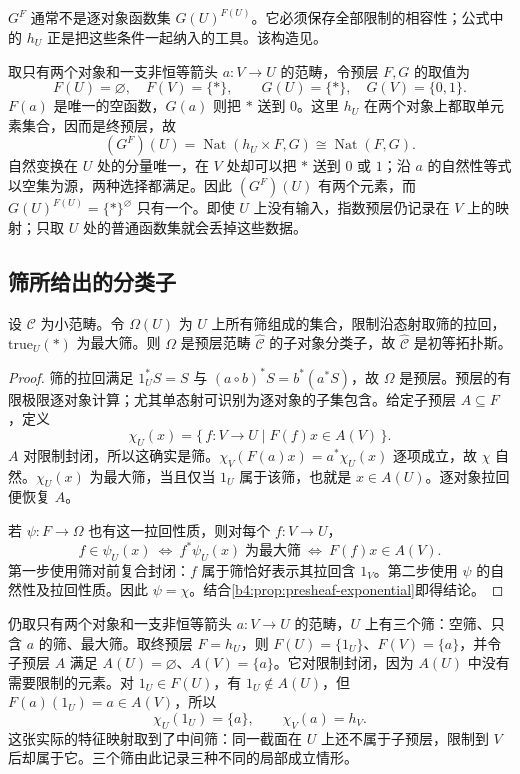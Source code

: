 \(G^F\) 通常不是逐对象函数集 \(G(U)^{F(U)}\)。它必须保存全部限制的相容性；公式中的 \(h_U\) 正是把这些条件一起纳入的工具。该构造见\cite[Chapter I, Section 6]{MacLaneMoerdijk1992Sheaves}。

\ProseParagraphBreak
取只有两个对象和一支非恒等箭头 \(a:V\to U\) 的范畴，令预层 \(F,G\) 的取值为
\[
	F(U)=\varnothing,\quad F(V)=\{*\},\qquad G(U)=\{*\},\quad G(V)=\{0,1\}.
\]
\(F(a)\) 是唯一的空函数，\(G(a)\) 则把 \(*\) 送到 \(0\)。这里 \(h_U\) 在两个对象上都取单元素集合，因而是终预层，故
\[
	(G^F)(U)=\operatorname{Nat}(h_U\times F,G) \cong\operatorname{Nat}(F,G).
\]
自然变换在 \(U\) 处的分量唯一，在 \(V\) 处却可以把 \(*\) 送到 \(0\) 或 \(1\)；沿 \(a\) 的自然性等式以空集为源，两种选择都满足。因此 \((G^F)(U)\) 有两个元素，而 \(G(U)^{F(U)}=\{*\}^{\varnothing}\) 只有一个。即使 \(U\) 上没有输入，指数预层仍记录在 \(V\) 上的映射；只取 \(U\) 处的普通函数集就会丢掉这些数据。

\subsection{筛所给出的分类子}
\label{b4:subsec:E02:03}

\begin{theorem}\label{b4:thm:presheaf-topos}
	设 \(\mathcal C\) 为小范畴。令 \(\Omega(U)\) 为 \(U\) 上所有筛组成的集合，限制沿态射取筛的拉回，\(\mathrm{true}_U(*)\) 为最大筛。则 \(\Omega\) 是预层范畴 \(\widehat{\mathcal C}\) 的子对象分类子，故 \(\widehat{\mathcal C}\) 是初等拓扑斯。
\end{theorem}
\begin{proof}
	筛的拉回满足 \(1_U^*S=S\) 与 \((a\circ b)^*S=b^*(a^*S)\)，故 \(\Omega\) 是预层。预层的有限极限逐对象计算；尤其单态射可识别为逐对象的子集包含。给定子预层 \(A\subseteq F\)，定义
	\[
		\chi_U(x)=\{\,f:V\to U\mid F(f)x\in A(V)\,\}.
	\]
	\(A\) 对限制封闭，所以这确实是筛。\(\chi_V(F(a)x)=a^*\chi_U(x)\) 逐项成立，故 \(\chi\) 自然。\(\chi_U(x)\) 为最大筛，当且仅当 \(1_U\) 属于该筛，也就是 \(x\in A(U)\)。逐对象拉回便恢复 \(A\)。

	若 \(\psi:F\to\Omega\) 也有这一拉回性质，则对每个 \(f:V\to U\)，
	\[
		f\in\psi_U(x) \ \Longleftrightarrow\ f^*\psi_U(x)\;\text{为最大筛} \ \Longleftrightarrow\ F(f)x\in A(V).
	\]
	第一步使用筛对前复合封闭：\(f\) 属于筛恰好表示其拉回含 \(1_V\)。第二步使用 \(\psi\) 的自然性及拉回性质。因此 \(\psi=\chi\)。结合\cref{b4:prop:presheaf-exponential}即得结论。
\end{proof}

仍取只有两个对象和一支非恒等箭头 \(a:V\to U\) 的范畴，\(U\) 上有三个筛：空筛、只含 \(a\) 的筛、最大筛。取终预层 \(F=h_U\)，则 \(F(U)=\{1_U\}\)、\(F(V)=\{a\}\)，并令子预层 \(A\) 满足 \(A(U)=\varnothing\)、\(A(V)=\{a\}\)。它对限制封闭，因为 \(A(U)\) 中没有需要限制的元素。对 \(1_U\in F(U)\)，有 \(1_U\notin A(U)\)，但 \(F(a)(1_U)=a\in A(V)\)，所以
\[
	\chi_U(1_U)=\{a\},\qquad \chi_V(a)=h_V.
\]
这张实际的特征映射取到了中间筛：同一截面在 \(U\) 上还不属于子预层，限制到 \(V\) 后却属于它。三个筛由此记录三种不同的局部成立情形。
